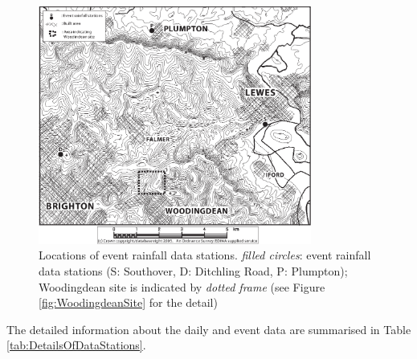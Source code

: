 \begin{figure}[phtb]
  \centering
  \includegraphics[width=0.8\textwidth]{./img/eventdatasite}
  \caption[Locations of event rainfall data stations]{Locations of event
rainfall data stations. \emph{filled circles}: event rainfall data stations (S:
Southover, D: Ditchling Road, P: Plumpton); Woodingdean site is indicated by
\emph{dotted frame} (see Figure \ref{fig:WoodingdeanSite} for the detail)}
  \label{fig:EventRainfallDataSite}
\end{figure}

The detailed information about the daily and event data are summarised in Table
\ref{tab:DetailsOfDataStations}.

